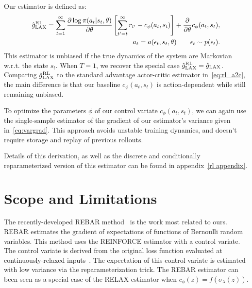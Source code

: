 \documentclass{article}
\newcommand{\LL}[1]{\frac{\partial \log \pi(a_{#1}| s_{#1}, \theta)}{\partial \theta}}
\newcommand{\YW}[1]{{\color{red} \bf [[YW: #1]]}}
\newcommand{\LAX}{{\textnormal{LAX}}}
\newcommand{\RL}{{\textnormal{RL}}}
\begin{document}
Our estimator is defined as: 
%
\begin{align}
\hat g_\LAX^{\RL} = \sum_{t=1}^{\infty} \LL{t} \left[ \sum_{t'=t}^{\infty} r_{t'} - c_\phi(a_t,s_t) \right] +\frac{\partial}{\partial\theta} c_\phi(a_t, s_t), \\
a_t = a(\epsilon_t,s_t, \theta) \qquad \epsilon_t \sim p(\epsilon_t)\nonumber.
\label{eq:rl_est}
\end{align}
%
This estimator is unbiased if the true dynamics of the system are Markovian w.r.t. the state $s_t$.
When $T = 1$, we recover the special case ${\hat g_\LAX^{\RL} = \hat g_\LAX}$.
Comparing $\hat g_\LAX^{\RL}$ to the standard advantage actor-critic estimator in~\eqref{eq:rl_a2c}, the main difference is that our baseline $c_\phi(a_t, s_t)$ is action-dependent while still remaining unbiased.

To optimize the parameters $\phi$ of our control variate $c_\phi(a_t, s_t)$, we can again use the single-sample estimator of the gradient of our estimator's variance given in~\eqref{eq:vargrad}.
This approach avoids unstable training dynamics, and doesn't require storage and replay of previous rollouts.

Details of this derivation, as well as the discrete and conditionally reparameterized version of this estimator can be found in appendix~\ref{rl appendix}.

\section{Scope and Limitations}
\label{limitations}
The recently-developed REBAR method~\citep{tucker2017rebar} is the work most related to ours.
REBAR estimates the gradient of expectations of functions of Bernoulli random variables.
This method uses the REINFORCE estimator with a control variate.
The control variate is derived from the original loss function evaluated at continuously-relaxed inputs~\citep{maddison2016concrete, jang2016categorical}.
The expectation of this control variate is estimated with low variance via the reparameterization trick.
The REBAR estimator can been seen as a special case of the RELAX estimator when ${c_\phi(z) = f(\sigma_\lambda(z))}$.
\end{document}
